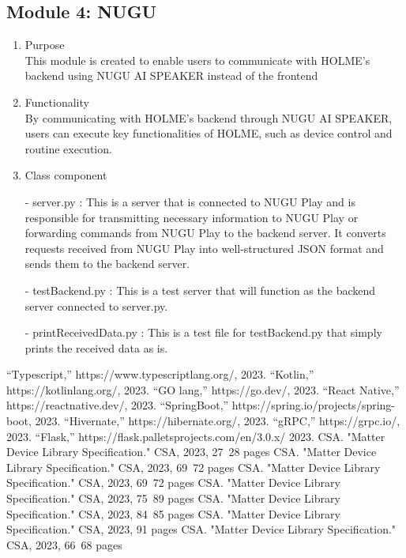 \documentclass[conference]{IEEEtran}
\begin{document}
\subsection{Module 4: NUGU}
\begin{enumerate}
    \item Purpose\\
    This module is created to enable users to communicate with HOLME's backend using NUGU AI SPEAKER instead of the frontend\\
    \item Functionality\\
    By communicating with HOLME's backend through NUGU AI SPEAKER, users can execute key functionalities of HOLME, such as device control and routine execution. \\
    \item Class component
        \item[-] server.py : This is a server that is connected to NUGU Play and is responsible for transmitting necessary information to NUGU Play or forwarding commands from NUGU Play to the backend server. It converts requests received from NUGU Play into well-structured JSON format and sends them to the backend server.\\
        \item[-] testBackend.py : This is a test server that will function as the backend server connected to server.py.\\
        \item[-] printReceivedData.py : This is a test file for testBackend.py that simply prints the received data as is.\\
\end{enumerate}

\clearpage
\begin{thebibliography}{9}
  “Typescript,” https://www.typescriptlang.org/, 2023.
  “Kotlin,” https://kotlinlang.org/, 2023.
  “GO lang,” https://go.dev/, 2023.
  “React Native,” https://reactnative.dev/, 2023.
  “SpringBoot,” https://spring.io/projects/spring-boot, 2023.
  “Hivernate,” https://hibernate.org/, 2023.
  “gRPC,” https://grpc.io/, 2023.
  “Flask,” https://flask.palletsprojects.com/en/3.0.x/ 2023.
 CSA. "Matter Device Library Specification." CSA, 2023, 27~28 pages
 CSA. "Matter Device Library Specification." CSA, 2023, 69~72 pages
 CSA. "Matter Device Library Specification." CSA, 2023, 69~72 pages
 CSA. "Matter Device Library Specification." CSA, 2023, 75~89 pages
 CSA. "Matter Device Library Specification." CSA, 2023, 84~85 pages
 CSA. "Matter Device Library Specification." CSA, 2023, 91 pages
 CSA. "Matter Device Library Specification." CSA, 2023, 66~68 pages

\end{thebibliography}
\end{document}
